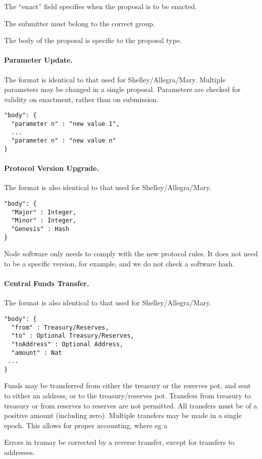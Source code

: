 The ``enact'' field specifies when the proposal is to be enacted.

The submitter must belong to the correct group.  

The body of the proposal is specific to the proposal type.


\paragraph{Parameter Update.}  The format is identical to that used for Shelley/Allegra/Mary.  Multiple parameters may be changed in a single proposal.
Parameters are checked for validity on enactment, rather than on submission.


\begin{verbatim}
"body": {
  "parameter n" : "new value 1",
  ...
  "parameter n" : "new value n"
}
\end{verbatim}

\paragraph{Protocol Version Upgrade.}  The format is also identical to that used for Shelley/Allegra/Mary.


\begin{verbatim}
"body": {
  "Major" : Integer,
  "Minor" : Integer,
  "Genesis" : Hash
}
\end{verbatim}

Node software only needs to comply with the new protocol rules.  It does not need to be a specific version, for example, and we do not check a software hash.



\paragraph{Central Funds Transfer.}  The format is also identical to that used for Shelley/Allegra/Mary.


\begin{verbatim}
"body": {
  "from" : Treasury/Reserves,
  "to" : Optional Treasury/Reserves,
  "toAddress" : Optional Address,
  "amount" : Nat
 ...
}
\end{verbatim}

Funds may be transferred from either the treasury or the reserves pot, and sent to either an address, or to the treasury/reserves pot.
Transfers from treasury to treasury or from reserves to reserves are not permitted.  All transfers must be of a positive amount (including zero).
Multiple transfers may be made in a single epoch.  This allows for proper accounting, where eg a

Errors in tramay be corrected by a reverse transfer, except for transfers to addresses.
